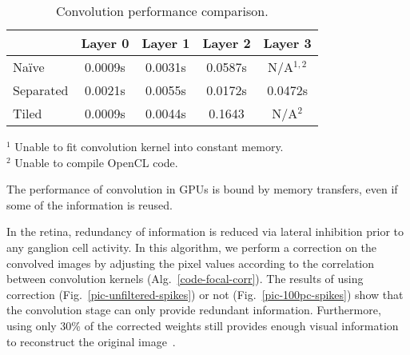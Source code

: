 \begin{table}[hbt]
  \begin{center}
    \caption{Convolution performance comparison.}
    \bgroup
    \def\arraystretch{1.4}
    \begin{tabular}{l c c c c}
      &
      \begin{minipage}{2cm}\centering Layer 0\vspace*{0.1cm}\end{minipage} & 
      \begin{minipage}{2cm}\centering
        Layer 1\vspace*{0.1cm}\end{minipage}& 
      \begin{minipage}{2cm}\centering
        Layer 2\vspace*{0.1cm}\end{minipage}& 
      \begin{minipage}{2cm}\centering
        Layer 3\vspace*{0.1cm}\end{minipage}\\
      \hline 
      
      Naïve     & 0.0009s & 0.0031s & 0.0587s & N/A$^{1,2}$ \\ 
      Separated & 0.0021s & 0.0055s & 0.0172s & 0.0472s \\ 
      Tiled     & 0.0009s & 0.0044s & 0.1643 & N/A$^2$\\
    \end{tabular} 
    \egroup
    {
      \footnotesize 
      \begin{center}
        $^1$ Unable to fit convolution kernel into constant memory.\\
        $^2$ Unable to compile OpenCL code.
      \end{center}
    }
  \end{center}
  \vspace*{-5pt}
\end{table}

The performance of convolution in GPUs is bound by memory transfers, even if some of the information is reused.



In the retina, redundancy of information is reduced via lateral inhibition 
prior to any ganglion cell activity. In this algorithm, we perform a correction 
on the convolved images by adjusting the pixel values
according to the correlation between convolution kernels 
(Alg.~\ref{code-focal-corr}). The results of using correction 
(Fig.~\ref{pic-unfiltered-spikes}) or not (Fig.~\ref{pic-100pc-spikes}) show 
that the convolution stage can only provide redundant information. Furthermore, 
using only 30\% of the corrected weights still provides enough visual 
information to reconstruct the original image~\cite{basab-model}.

